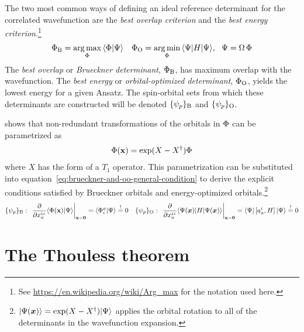 \documentclass[11pt]{article}
\numberwithin{equation}{section}
\begin{document}
\begin{rmk}
The two most common ways of defining an ideal reference determinant for the correlated wavefunction are the \textit{best overlap criterion} and the \textit{best energy criterion}.\footnote{See \url{https://en.wikipedia.org/wiki/Arg_max} for the notation used here.}
\begin{align}
\label{eq:brueckner-and-oo-general-condition}
  \F_{\mr{B}}
=
  \underset{\F}{\arg\max}\,
  \ip{\F|\Y}
&&
  \F_{\mr{O}}
=
  \underset{\F}{\arg\min}\,
  \ip{\Y|H|\Y},\ \ 
  \Y
=
  \W\,\F
\end{align}
The \textit{best overlap} or \textit{Brueckner determinant}, $\Phi _{\mathrm{B}}$, has maximum overlap with the wavefunction.
The \textit{best energy} or \textit{orbital-optimized determinant}, $\Phi _{\mathrm{O}}$, yields the lowest energy for a given Ansatz.
The spin-orbital sets from which these determinants are constructed will be denoted $\{\psi _p\}_{\mathrm{B}}$ and $\{\psi _p\}_{\mathrm{O}}$.
\end{rmk}

\begin{rmk}
shows that non-redundant transformations of the orbitals in $\Phi $ can be parametrized as
\begin{align}
  \Phi (\mathbf{x})
=
  \mathrm{exp}(X - X^\dagger)
  \Phi 
\end{align}
where $X$ has the form of a $T_1$ operator.
This parametrization can be substituted into equation~\ref{eq:brueckner-and-oo-general-condition} to derive the explicit conditions satisfied by Brueckner orbitals and energy-optimized orbitals.\footnote{
  $\kt{\Y(\bm{x})}=\mr{exp}(X-X\dg)\kt{\Y}$ applies the orbital rotation to all of the determinants in the wavefunction expansion.
  }
\begin{align*}
  \{\y_p\}_\mr{B}:\,\,
  \left.
  \pd{}{x_a^{i*}}
  \ip{\F(\bo{x})|\Y}
  \right|_{\bo{x}=\bo{0}}
=
  \ip{\F_i^a|\Y}
\overset{!}{=}
  0
&&
  \{\y_p\}_\mr{O}:\,\,
  \left.
  \pd{}{x_a^{i*}}
  \ip{\Y(\bm{x})|H|\Y(\bm{x})}
  \right|_{\bo{x}=\bo{0}}
=
  \ip{\Y|\,[a^i_a, H]\,|\Y}
\overset{!}{=}
  0
\end{align*}
\end{rmk}





\newpage
\appendix

\section{The Thouless theorem}
\label{appendix:thouless}
\end{document}
